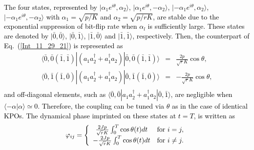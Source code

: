 \documentclass[%
 reprint,
 amsmath,amssymb,
 aps,
pra,
]{revtex4-2}
\begin{document}
\textcolor{black}{
The four states, represented by $|\alpha_1 e^{i\theta},\alpha_2 \rangle$, $|\alpha_1 e^{i\theta},-\alpha_2 \rangle$, $|-\alpha_1 e^{i\theta},\alpha_2 \rangle$, $|-\alpha_1 e^{i\theta},-\alpha_2 \rangle$ with $\alpha_1=\sqrt{p/K}$ and $\alpha_2=\sqrt{p/rK}$, are stable due to the exponential suppression of bit-flip rate when $\alpha_l$ is sufficiently large.
These states are denoted by $|\bar{0},\bar{0}\rangle$, $|\bar{0},\bar{1}\rangle$, $|\bar{1},\bar{0}\rangle$ and $|\bar{1},\bar{1}\rangle$, respectively.
Then, the counterpart of Eq.~(\ref{Int_11_29_21}) is represented as 
\begin{eqnarray}
\langle \bar{0},\bar{0} (\bar{1},\bar{1})| (a_1 a_2^\dagger + a_1^\dagger a_2) |  \bar{0},\bar{0} (\bar{1},\bar{1}) \rangle
&=& \frac{2p}{\sqrt{r}K} \cos\theta, \nonumber\\
\langle \bar{0},\bar{1} (\bar{1},\bar{0}) | (a_1 a_2^\dagger + a_1^\dagger a_2) |  \bar{0},\bar{1} (\bar{1},\bar{0}) \rangle
&=& - \frac{2p}{\sqrt{r}K} \cos\theta,
\nonumber\\
\end{eqnarray}
and off-diagonal elements, such as 
$\langle \bar{0},  \bar{0}  | a_1 a_2^\dagger + a_1^\dagger a_2 |  \bar{0},  \bar{1} \rangle$, are negligible when $\langle -\alpha| \alpha \rangle\simeq 0$.
Therefore, the coupling can be tuned via $\theta$ as in the case of identical KPOs.
The dynamical phase imprinted on these states at $t=T$, is written as
\begin{eqnarray}
\varphi_{ij} = \left\{
\begin{array}{cl}
\frac{2Jp}{\sqrt{r}K}\int_0^T  \cos\theta(t) dt &  {\rm for} \ i=j, \\
-\frac{2Jp}{\sqrt{r}K}\int_0^T \cos\theta(t) dt & {\rm for} \ i\ne j.
\end{array}
\right.
\label{theta_5_23_22}
\end{eqnarray}
}
\end{document}
